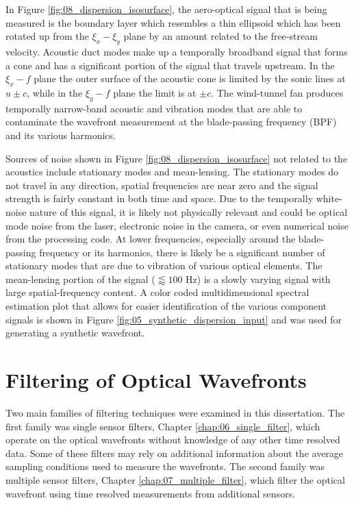 In Figure \ref{fig:08_dispersion_isosurface}, the aero-optical signal that is being measured is the boundary layer which resembles a thin ellipsoid which has been rotated up from the $\xi_x-\xi_y$ plane by an amount related to the free-stream velocity.
Acoustic duct modes make up a temporally broadband signal that forms a cone and has a significant portion of the signal that travels upstream.
In the $\xi_x-f$ plane the outer surface of the acoustic cone is limited by the sonic lines at $u\pm c$, while in the $\xi_y-f$ plane the limit is at $\pm c$.
The wind-tunnel fan produces temporally narrow-band acoustic and vibration modes that are able to contaminate the wavefront measurement at the blade-passing frequency (BPF) and its various harmonics.

Sources of noise shown in Figure \ref{fig:08_dispersion_isosurface} not related to the acoustics include stationary modes and mean-lensing.
The stationary modes do not travel in any direction, spatial frequencies are near zero and the signal strength is fairly constant in both time and space.
Due to the temporally white-noise nature of this signal, it is likely not physically relevant and could be optical mode noise from the laser, electronic noise in the camera, or even numerical noise from the processing code.
At lower frequencies, especially around the blade-passing frequency or its harmonics, there is likely be a significant number of stationary modes that are due to vibration of various optical elements.
The mean-lensing portion of the signal ($\lessapprox 100$ Hz) is a slowly varying signal with large spatial-frequency content.
A color coded multidimensional spectral estimation plot that allows for easier identification of the various component signals is shown in Figure \ref{fig:05_synthetic_dispersion_input} and was used for generating a synthetic wavefront.

\section{Filtering of Optical Wavefronts}
Two main families of filtering techniques were examined in this dissertation.
The first family was single sensor filters, Chapter \ref{chap:06_single_filter}, which operate on the optical wavefronts without knowledge of any other time resolved data.
Some of these filters may rely on additional information about the average sampling conditions used to measure the wavefronts.
The second family was multiple sensor filters, Chapter \ref{chap:07_multiple_filter}, which filter the optical wavefront using time resolved measurements from additional sensors.

